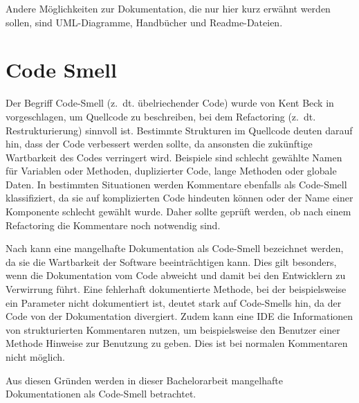 Andere Möglichkeiten zur Dokumentation, die nur hier kurz erwähnt werden sollen, sind UML-Diagramme, Handbücher und  Readme-Dateien.

\section{Code Smell}\label{chapter:code_smell}
Der Begriff Code-Smell (z.~dt. übelriechender Code)  wurde von Kent Beck in \cite[S. 71 ff.]{fowler2019refactoring}  vorgeschlagen, um Quellcode zu beschreiben, bei dem Refactoring (z.~dt. Restrukturierung) sinnvoll ist. Bestimmte Strukturen im Quellcode deuten darauf hin, dass der Code verbessert werden sollte, da ansonsten die zukünftige Wartbarkeit des Codes verringert wird. Beispiele sind schlecht gewählte Namen für Variablen oder Methoden, duplizierter Code, lange Methoden oder globale Daten. In bestimmten Situationen werden Kommentare ebenfalls als Code-Smell klassifiziert, da sie auf komplizierten  Code hindeuten können oder der Name einer Komponente schlecht gewählt wurde. Daher sollte geprüft werden, ob nach einem Refactoring die Kommentare noch notwendig sind.

Nach \cite[S. 249-250]{JavadocViolationsandTheirEvolutioninOpen-SourceSoftware} kann eine mangelhafte Dokumentation als Code-Smell bezeichnet werden, da sie die Wartbarkeit der Software beeinträchtigen kann. Dies gilt besonders, wenn die Dokumentation vom Code abweicht und damit bei den Entwicklern zu Verwirrung führt. Eine fehlerhaft dokumentierte Methode, bei der beispielsweise ein Parameter nicht dokumentiert ist, deutet stark auf Code-Smells hin, da der Code von der Dokumentation divergiert. Zudem kann eine \ac{IDE} die Informationen von strukturierten Kommentaren nutzen, um beispielsweise den Benutzer einer Methode Hinweise zur Benutzung zu geben. Dies ist bei normalen Kommentaren nicht möglich. 

Aus diesen Gründen werden in dieser Bachelorarbeit mangelhafte Dokumentationen als Code-Smell betrachtet.

